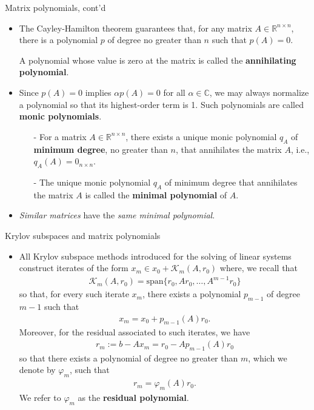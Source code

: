 \documentclass[t,usepdftitle=false]{beamer}
\begin{document}
\begin{frame}{Matrix polynomials, cont'd}
\begin{itemize}
\item The Cayley-Hamilton theorem guarantees that, for any matrix $A\in\mathbb{R}^{n\times n}$, there is a polynomial $p$ of degree no greater than $n$ such that $p(A)=0$.
\item[] A polynomial whose value is zero at the matrix is called the \textbf{annihilating polynomial}.
\item Since $p(A)=0$ implies $\alpha p(A)=0$ for all $\alpha\in\mathbb{C}$, we may always normalize a polynomial so that its highest-order term is 1.
Such polynomials are called \textbf{monic polynomials}.
\begin{theorem}
\begin{itemize}\normalsize
\item[-] For a matrix $A\in\mathbb{R}^{n\times n}$, there exists a unique monic polynomial $q_A$ of \textbf{minimum degree}, no greater than $n$, that annihilates the matrix $A$, i.e., $q_A(A)=0_{n\times n}$.\\
\item[-] The unique monic polynomial $q_A$ of minimum degree that annihilates the matrix $A$ is called the \textbf{minimal polynomial} of $A$.
\end{itemize}
\end{theorem}
\item \textit{Similar matrices} have the \textit{same minimal polynomial}.
\end{itemize}
\end{frame}

\begin{frame}{Krylov subspaces and matrix polynomials}
\begin{itemize}
\item All Krylov subspace methods introduced for the solving of linear systems construct iterates of the form $x_m\in x_0+\mathcal{K}_m(A,r_0)$ where, we recall that
\begin{align*}
\mathcal{K}_m(A,r_0)=\text{span}\{r_0,Ar_0,\dots,A^{m-1}r_0\}
\end{align*}
so that, for every such iterate $x_m$, there exists a polynomial $p_{m-1}$ of degree $m-1$ such that
\begin{align*}
x_m=x_0+p_{m-1}(A)r_0.
\end{align*}
Moreover, for the residual associated to such iterates, we have
\begin{align*}
r_m:=b-Ax_m=r_0-Ap_{m-1}(A)r_0
\end{align*}
so that there exists a polynomial of degree no greater than $m$, which we denote by $\varphi_m$, such that
\begin{align*}
r_m=\varphi_m(A)r_0.
\end{align*}
We refer to $\varphi_m$ as the \textbf{residual polynomial}.
\end{itemize}
\end{frame}
\end{document}
